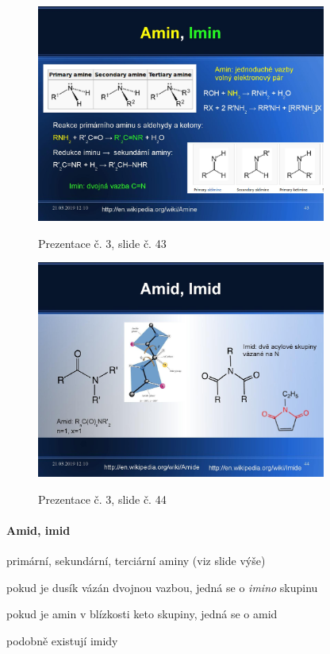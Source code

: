 \documentclass[DIV=8]{scrreprt}
\begin{document}
\begin{figure}
    \caption{Prezentace č. 3, slide č. 43}
    \includegraphics[width=0.85\textwidth]{slides-3/slide-43.jpg}
    \centering
    \label{slides-3-slide-43}
\end{figure}
\begin{figure}
    \caption{Prezentace č. 3, slide č. 44}
    \includegraphics[width=0.85\textwidth]{slides-3/slide-44.jpg}
    \centering
    \label{slides-3-slide-44}
\end{figure}

\paragraph{Amid, imid}
\begin{myItemize}[nosep]
    \item primární, sekundární, terciární aminy (viz slide výše)
\begin{myItemize}[nosep]
    \item pokud je dusík vázán dvojnou vazbou, jedná se o \emph{imino} skupinu
\end{myItemize}

    \item pokud je amin v blízkosti keto skupiny, jedná se o amid
\begin{myItemize}[nosep]
    \item podobně existují imidy
\end{myItemize}

\end{myItemize}
\end{document}
